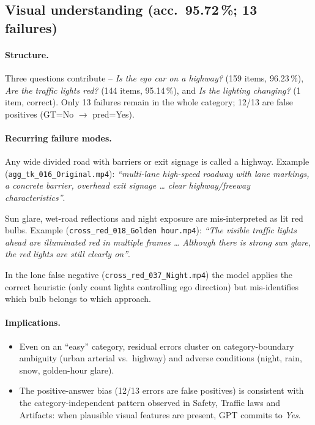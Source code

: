 \documentclass[11pt,a4paper]{article}
\newcommand{\pct}[1]{#1\,\%}
\newcommand{\code}[1]{\texttt{#1}}
\begin{document}
\subsection{Visual understanding (acc.~\pct{95.72}; 13 failures)}
\label{sec:visual}

\paragraph{Structure.} Three questions contribute -- \emph{Is the ego
car on a highway?} (159 items, \pct{96.23}), \emph{Are the traffic
lights red?} (144 items, \pct{95.14}), and \emph{Is the lighting
changing?} (1 item, correct). Only 13 failures remain in the whole
category; 12/13 are false positives (GT=No $\to$ pred=Yes).

\paragraph{Recurring failure modes.}
\begin{description}[style=nextline]
  \item[Highway over-recognition.] Any wide divided road with
  barriers or exit signage is called a highway. Example
  (\code{agg\_tk\_016\_Original.mp4}): \emph{``multi-lane high-speed
  roadway with lane markings, a concrete barrier, overhead exit
  signage \ldots{} clear highway/freeway characteristics''}.
  \item[Red-light hallucination under glare / wet roads.] Sun glare,
  wet-road reflections and night exposure are mis-interpreted as lit
  red bulbs. Example (\code{cross\_red\_018\_Golden hour.mp4}):
  \emph{``The visible traffic lights ahead are illuminated red in
  multiple frames \ldots{} Although there is strong sun glare, the
  red lights are still clearly on''}.
  \item[Cross-direction signal confusion.] In the lone false negative
  (\code{cross\_red\_037\_Night.mp4}) the model applies the correct
  heuristic (only count lights controlling ego direction) but
  mis-identifies which bulb belongs to which approach.
\end{description}

\paragraph{Implications.}
\begin{itemize}
  \item Even on an ``easy'' category, residual errors cluster on
  category-boundary ambiguity (urban arterial vs.~highway) and
  adverse conditions (night, rain, snow, golden-hour glare).
  \item The positive-answer bias (12/13 errors are false positives)
  is consistent with the category-independent pattern observed in
  Safety, Traffic laws and Artifacts: when plausible visual features
  are present, GPT commits to \emph{Yes}.
\end{itemize}
\end{document}
